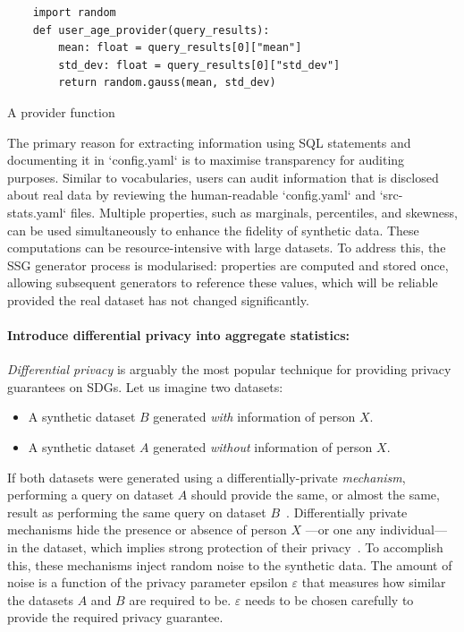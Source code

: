 \documentclass[11pt]{article}
\begin{document}
\begin{listing}[H]
\begin{verbatim}
    import random
    def user_age_provider(query_results):
        mean: float = query_results[0]["mean"]
        std_dev: float = query_results[0]["std_dev"]
        return random.gauss(mean, std_dev)
\end{verbatim} 
\caption{A provider function }
\label{lst:provider-function}
\end{listing}

The primary reason for extracting information using SQL statements and documenting it in `config.yaml` is to maximise transparency for auditing purposes. Similar to vocabularies, users can audit information that is disclosed about real data by reviewing the human-readable `config.yaml` and `src-stats.yaml` files. Multiple properties, such as marginals, percentiles, and skewness, can be used simultaneously to enhance the fidelity of synthetic data. These computations can be resource-intensive with large datasets. To address this, the SSG generator process is modularised: properties are computed and stored once, allowing subsequent generators to  reference these values, which will be reliable provided the real dataset has not changed significantly.

\paragraph{Introduce differential privacy into aggregate statistics:}

\emph{Differential privacy} is arguably the most popular technique for providing privacy guarantees on SDGs.
Let us imagine two datasets:

\begin{itemize}
    \item A synthetic dataset $B$ generated \emph{with} information of person $X$.
    \item A synthetic dataset $A$ generated \emph{without} information of person $X$.
\end{itemize}

If both datasets were generated using a differentially-private \emph{mechanism}, performing a query on dataset $A$ should provide the same, or almost the same, result as performing the same query on dataset $B$~\cite{Kopp2021MicrosoftSD}.
Differentially private mechanisms hide the presence or absence of person $X$ ---or one any individual--- in the dataset, which implies strong protection of their privacy~\cite{near2021}.
To accomplish this, these mechanisms inject random noise to the synthetic data.
The amount of noise is a function of the privacy parameter epsilon $\varepsilon$ that measures how similar the datasets $A$ and $B$ are required to be. $\varepsilon$ needs to be chosen carefully to provide the required privacy guarantee.
\end{document}
